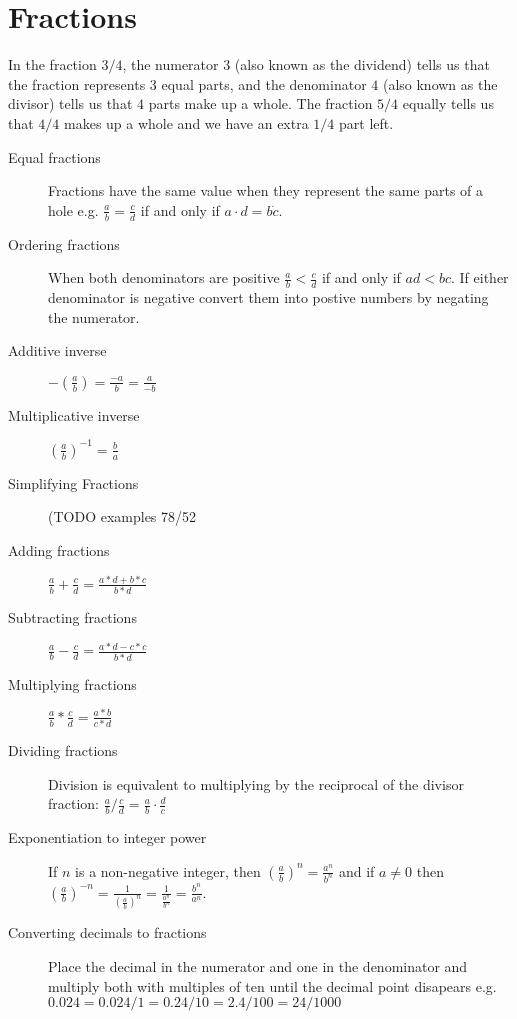 \section{Fractions}
In the fraction $3/4$, the numerator $3$ (also known as the dividend) tells us that the fraction represents $3$ equal parts, and the denominator $4$ (also known as the divisor) tells us that $4$ parts make up a whole. The fraction $5/4$ equally tells us that $4/4$ makes up a whole and we have an extra $1/4$ part left.
\begin{description}
\item [Equal fractions] Fractions have the same value when they represent the
same parts of a hole e.g. $\frac{a}{b} = \frac{c}{d}$ if and only if
$a \cdot d = b \dot c$.
\item [Ordering fractions] When both denominators are positive
$\frac{a}{b} < \frac{c}{d}$ if and only if $ad < bc$. If either denominator is
negative convert them into postive numbers by negating the numerator.
\item [Additive inverse] $-\left(\frac{a}{b}\right) = \frac{-a}{b} = \frac{a}{-b}$
\item [Multiplicative inverse] $\left(\frac{a}{b}\right)^{-1} = \frac{b}{a}$
\item [Simplifying Fractions] (TODO examples 78/52
\item [Adding fractions] $\frac{a}{b} + \frac{c}{d} = \frac{a*d + b*c}{b*d}$
\item [Subtracting fractions] $\frac{a}{b} - \frac{c}{d} = \frac{a*d - c*c}{b*d}$
\item [Multiplying fractions] $\frac{a}{b} * \frac{c}{d} = \frac{a*b}{c*d}$
\item [Dividing fractions] Division is equivalent to multiplying by the
reciprocal of the divisor fraction: $\frac{a}{b}/\frac{c}{d} =
\frac{a}{b} \cdot \frac{d}{c}$
\item [Exponentiation to integer power] If $n$ is a non-negative integer, then
$\left(\frac{a}{b}\right)^{n} = \frac{a^n}{b^n}$ and if $a \neq 0$ then
$\left(\frac{a}{b}\right)^{-n} = \frac{1}{\left(\frac{a}{b}\right)^n} =
\frac{1}{\frac{a^n}{b^n}} =\frac{b^n}{a^n}$.
\item [Converting decimals to fractions] Place the decimal in the numerator
and one in the denominator and multiply both with multiples of ten until the
decimal point disapears e.g. $0.024 = 0.024/1 = 0.24/10 = 2.4/100 = 24/1000$
\end{description}

